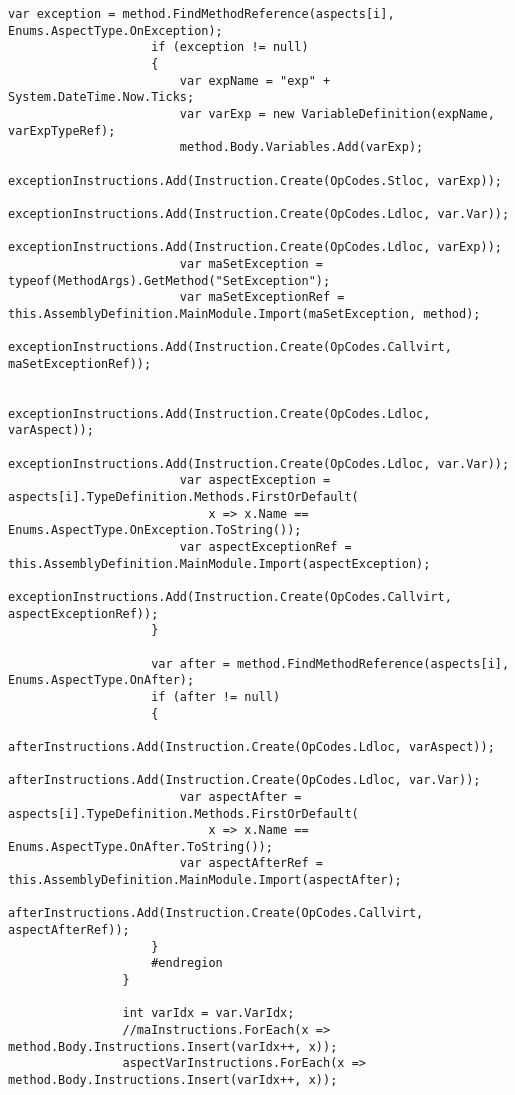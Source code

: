 \begin{lstlisting}[caption={../buffalo/Injectors/MethodBoundaryInjector.cs}, label=../buffalo/Injectors/MethodBoundaryInjector.cs, frame=tb, basicstyle=\scriptsize]
                    var exception = method.FindMethodReference(aspects[i], Enums.AspectType.OnException);
                    if (exception != null)
                    {
                        var expName = "exp" + System.DateTime.Now.Ticks;
                        var varExp = new VariableDefinition(expName, varExpTypeRef);
                        method.Body.Variables.Add(varExp);
                        exceptionInstructions.Add(Instruction.Create(OpCodes.Stloc, varExp));
                        exceptionInstructions.Add(Instruction.Create(OpCodes.Ldloc, var.Var));
                        exceptionInstructions.Add(Instruction.Create(OpCodes.Ldloc, varExp));
                        var maSetException = typeof(MethodArgs).GetMethod("SetException");
                        var maSetExceptionRef = this.AssemblyDefinition.MainModule.Import(maSetException, method);
                        exceptionInstructions.Add(Instruction.Create(OpCodes.Callvirt, maSetExceptionRef));

                        exceptionInstructions.Add(Instruction.Create(OpCodes.Ldloc, varAspect));
                        exceptionInstructions.Add(Instruction.Create(OpCodes.Ldloc, var.Var));
                        var aspectException = aspects[i].TypeDefinition.Methods.FirstOrDefault(
                            x => x.Name == Enums.AspectType.OnException.ToString());
                        var aspectExceptionRef = this.AssemblyDefinition.MainModule.Import(aspectException);
                        exceptionInstructions.Add(Instruction.Create(OpCodes.Callvirt, aspectExceptionRef));
                    }

                    var after = method.FindMethodReference(aspects[i], Enums.AspectType.OnAfter);
                    if (after != null)
                    {
                        afterInstructions.Add(Instruction.Create(OpCodes.Ldloc, varAspect));
                        afterInstructions.Add(Instruction.Create(OpCodes.Ldloc, var.Var));
                        var aspectAfter = aspects[i].TypeDefinition.Methods.FirstOrDefault(
                            x => x.Name == Enums.AspectType.OnAfter.ToString());
                        var aspectAfterRef = this.AssemblyDefinition.MainModule.Import(aspectAfter);
                        afterInstructions.Add(Instruction.Create(OpCodes.Callvirt, aspectAfterRef));
                    }
                    #endregion
                }

                int varIdx = var.VarIdx;
                //maInstructions.ForEach(x => method.Body.Instructions.Insert(varIdx++, x));
                aspectVarInstructions.ForEach(x => method.Body.Instructions.Insert(varIdx++, x));


\end{lstlisting}
